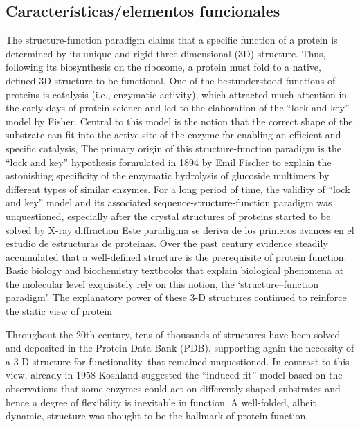 \subsection{Características/elementos funcionales}
\label{functionalLandscape}


The structure-function paradigm claims that a specific function of a protein is determined by its unique and rigid three-dimensional (3D) structure. 
Thus, following its biosynthesis on the ribosome, a protein must fold to a native, defined 3D structure to be functional. 
One of the bestunderstood functions of proteins is catalysis (i.e., enzymatic activity), which attracted much attention in the early days of
protein science and led to the elaboration of the “lock and key” model by Fisher. 
Central to this model is the notion that the correct shape of the substrate can fit into the active site of the enzyme for enabling an efficient and specific catalysis,
The primary origin of this structure-function paradigm is the “lock and key” hypothesis formulated in 1894 by Emil Fischer to explain the astonishing specificity of the enzymatic hydrolysis of glucoside multimers by different types
of similar enzymes. For a long period of time, the validity of “lock and key” model and its associated sequence-structure-function paradigm was unquestioned, especially after the crystal structures of proteins started to be solved by X-ray diffraction
Este paradigma se deriva de los primeros avances en el estudio de estructuras de proteinas. Over the past century evidence steadily accumulated that a well-defined structure is the prerequisite of protein function.
Basic biology and biochemistry textbooks that explain biological phenomena at the molecular level exquisitely rely on this notion, the ‘structure–function paradigm’.
The explanatory power of these 3-D structures continued to reinforce the static view of protein

Throughout the 20th century, tens of thousands of structures have been solved and deposited in the Protein Data Bank (PDB), supporting again the necessity of a 3-D structure for functionality.
that remained unquestioned.
In contrast to this view, already in 1958 Koshland suggested the “induced-fit” model based on the observations that some enzymes could act on
differently shaped substrates and hence a degree of flexibility is inevitable in function. 
A well-folded, albeit dynamic, structure was thought to be the hallmark of protein function.



